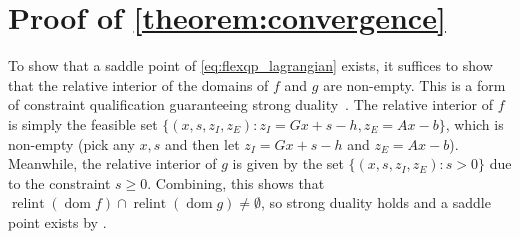 \documentclass{article} %
\DeclareMathOperator{\relint}{relint}
\DeclareMathOperator{\dom}{dom}
\begin{document}
\begin{algorithm}[H]
\caption{FlexQP} \label{alg:FlexQP}
\end{algorithm}


\section{Proof of \cref{theorem:convergence}}
\label{appendix:proof_of_convergence}

To show that a saddle point of \cref{eq:flexqp_lagrangian} exists, it suffices to show that the relative interior of the domains of $f$ and $g$ are non-empty.
This is a form of constraint qualification guaranteeing strong duality~\citep[Theorem 16.4]{rockafellar1970convex}.
The relative interior of $f$ is simply the feasible set $\{ (x, s, z_I, z_E) : z_I = Gx + s - h, z_E = Ax - b \}$, which is non-empty (pick any $x, s$ and then let $z_I = Gx + s - h$ and $z_E = Ax - b$).
Meanwhile, the relative interior of $g$ is given by the set $\{ (x, s, z_I, z_E) : s > 0\}$ due to the constraint $s \geq 0$.
Combining, this shows that $\relint(\dom f) \cap \relint(\dom g) \neq \emptyset$, so strong duality holds and a saddle point exists by \citet[Theorem 37.3]{rockafellar1970convex}.
\end{document}
